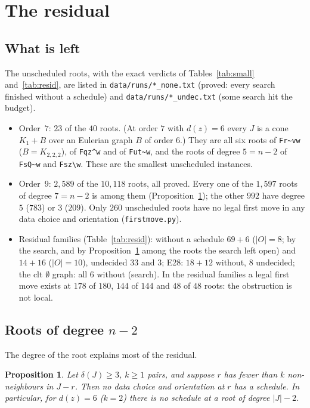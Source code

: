 \documentclass[11pt]{amsart}
\newtheorem{proposition}[theorem]{Proposition}
\theoremstyle{definition}
\newcommand{\lean}[1]{\quad{\footnotesize[Lean: \texttt{#1}]}}
\begin{document}
\section{The residual}\label{sec:resid}

\subsection*{What is left} The unscheduled roots, with the exact verdicts of Tables~\ref{tab:small}
and~\ref{tab:resid}, are listed in \texttt{data/runs/*\_none.txt} (proved: every search finished
without a schedule) and \texttt{data/runs/*\_undec.txt} (some search hit the budget).
\begin{itemize}
\item Order~$7$: $23$ of the $40$ roots. (At order $7$ with $d(z)=6$ every $J$ is a cone $K_1+B$
over an Eulerian graph $B$ of order $6$.) They are all six roots of \texttt{Fr\textasciitilde vw} ($B=K_{2,2,2}$), of
\texttt{Fqz\textasciicircum w} and of \texttt{Fut\textasciitilde w}, and the roots of degree
$5=n-2$ of \texttt{FsQ\textasciitilde w} and \texttt{Fsz\textbackslash w}. These are the smallest
unscheduled instances.
\item Order~$9$: $2{,}589$ of the $10{,}118$ roots, all proved. Every one of the $1{,}597$ roots of
degree $7=n-2$ is among them (Proposition~\ref{prop:nminus2}); the other $992$ have degree $5$ ($783$)
or $3$ ($209$). Only $260$ unscheduled roots have no legal first move in any data choice and
orientation (\texttt{firstmove.py}).
\item Residual families (Table~\ref{tab:resid}): without a schedule $69+6$ ($|O|=8$; by the search,
and by Proposition~\ref{prop:nminus2} among the roots the search left open) and $14+16$ ($|O|=10$),
undecided $33$ and $3$; E28: $18+12$ without, $8$ undecided; the clt $\emptyset$ graph: all $6$
without (search). In the
residual families a legal first move exists at $178$ of $180$, $144$ of $144$ and $48$ of $48$
roots: the obstruction is not local.
\end{itemize}

\subsection*{Roots of degree $n-2$} The degree of the root explains most of the residual.

\begin{proposition}\label{prop:nminus2}
Let $\delta(J)\ge3$, $k\ge1$ pairs, and suppose $r$ has fewer than $k$ non-neighbours in $J-r$. Then
no data choice and orientation at $r$ has a schedule. In particular, for $d(z)=6$ ($k=2$) there is
no schedule at a root of degree $|J|-2$.\lean{not\_steerK\_triangle, not\_steerK}
\end{proposition}
\end{document}
